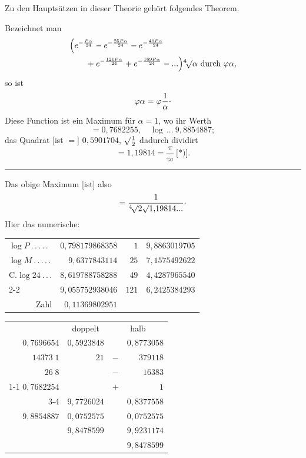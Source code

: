 \begingroup
\newcommand{\TransBracket}[1]{\boldsymbol{[}#1\boldsymbol{]}}
\newcommand{\IndexSurd}[1]{{}^{#1}\!\surd}
\par\indent Zu den Hauptsätzen in dieser Theorie gehört folgendes Theorem.
\par\indent Bezeichnet man
\[\begin{aligned}
&\Bigl(e^{-\frac{P\alpha}{24}}-e^{-\frac{25P\alpha}{24}}-e^{-\frac{49P\alpha}{24}}\\
&\qquad+e^{-\frac{121P\alpha}{24}}+e^{-\frac{169P\alpha}{24}}-{.}{.}{.}\Bigr)\IndexSurd{4}\alpha\ \text{durch }\varphi\alpha,
\end{aligned}\]
\noindent so ist
\[
\varphi\alpha=\varphi\frac1\alpha\mathpunct{\raisebox{.5ex}{.}}
\]
\noindent Diese Function ist ein Maximum für $\alpha=1$, wo ihr Werth
\[
=0{,}7682255,\quad\log\,{.}{.}{.}\ 9{,}8854887;
\]
\noindent das Quadrat [ist $=$] $0{,}5901704$, $\surd\frac12$ dadurch dividirt
\[
=1{,}19814=\frac\pi\varpi\ \text{[*)]}.
\]
\par\smallskip\noindent\rule{.25\linewidth}{.4pt}\par
{\small
\par\indent [*)] Das obige Maximum [ist] also
\[
=\frac1{\IndexSurd{4}2\surd1{,}19814{.}{.}{.}}\mathpunct{\raisebox{.5ex}{.}}
\]
\noindent Hier das numerische:
\begin{center}
\setlength{\tabcolsep}{5pt}
\renewcommand{\arraystretch}{1.12}
\begin{tabular}{@{}l r|r|r|}
$\log P\ { .}\,{.}\,{.}\,{.}\,{.}$&$0{,}798179868358$&$1$&$9{,}8863019705$\\
$\log M\ { .}\,{.}\,{.}\,{.}\,{.}$&$9{,}6377843114$&$25$&$7{,}1575492622$\\
$\mathrm{C}.\log24\ { .}\,{.}\,{.}$&$8{,}619788758288$&$49$&$4{,}4287965540$\\\cline{2-2}
&$9{,}055752938046$&$121$&$6{,}2425384293$\\
\multicolumn{1}{r}{Zahl}&$0{,}11369802951$&\multicolumn{2}{c}{}\\
\end{tabular}
\par\medskip
\begin{tabular}{@{}r|r|r r@{}}
\multicolumn{1}{r}{}&\multicolumn{1}{c}{doppelt}&\multicolumn{2}{c}{halb}\\
$0{,}7696654$&$0{,}5923848$&&$0{,}8773058$\\
$14373\;1$&$21$&$-$&$379118$\\
$26\;8$&&$-$&$16383$\\\cline{1-1}
$0{,}7682254$&&$+$&$1$\\\cline{3-4}
\multicolumn{1}{r}{}&\multicolumn{1}{r}{$9{,}7726024$}&&$0{,}8377558$\\
\multicolumn{1}{r}{$9{,}8854887$}&\multicolumn{1}{r}{$0{,}0752575$}&&$0{,}0752575$\\
\multicolumn{1}{r}{}&\multicolumn{1}{r}{$9{,}8478599$}&&$9{,}9231174$\\
\multicolumn{1}{r}{}&\multicolumn{1}{r}{}&&$9{,}8478599$\\
\end{tabular}
\end{center}
\par}
